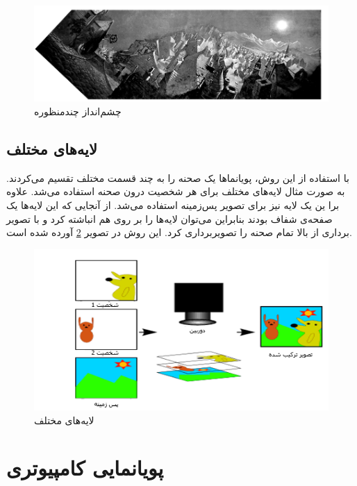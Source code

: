 \begin{figure}[ht]
	\centerline{\includegraphics[width=\textwidth,height=\textheight,keepaspectratio]{Figures/Ch1/Panorama.png}}

	\caption{چشم‌انداز چندمنظوره}
	\label{fig:Panorama}
\end{figure}


\subsection{لایه‌های مختلف}

با استفاده از این روش، پویانما‌ها یک صحنه را به چند قسمت مختلف تقسیم می‌کردند.
به صورت مثال لایه‌های مختلف برای هر شخصیت درون صحنه استفاده می‌شد. علاوه برا ین یک لایه نیز برای تصویر پس‌زمینه استفاده می‌شد.
از آنجایی که این لایه‌ها یک صفحه‌ی شفاف بودند بنابراین می‌توان لایه‌‌ها را 
بر روی هم انباشته کرد و با تصویر برداری از بالا تمام صحنه را تصویربرداری کرد.
این روش در تصویر 
\ref{fig:DifferentLayers}
آورده شده است.

\begin{figure}[ht]
	\centerline{\includegraphics[width=\textwidth,height=\textheight,keepaspectratio]{Figures/Ch1/DifferentLayers.png}}

	\caption{لایه‌های مختلف}
	\label{fig:DifferentLayers}
\end{figure}

\section{پویانمایی کامپیوتری}

